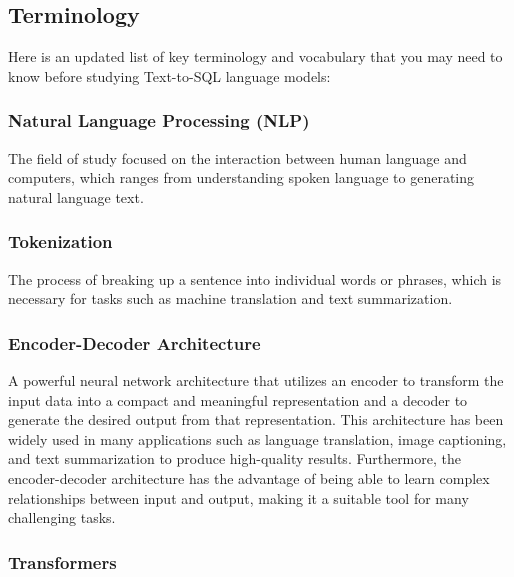 \subsection{Terminology}

Here is an updated list of key terminology and vocabulary that you may need to know before studying Text-to-SQL language models:

\subsubsection{Natural Language Processing (NLP)}

The field of study focused on the interaction between human language and computers, which ranges from understanding spoken language to generating natural language text.

\subsubsection{Tokenization}

The process of breaking up a sentence into individual words or phrases, which is necessary for tasks such as machine translation and text summarization.

\subsubsection{Encoder-Decoder Architecture}

A powerful neural network architecture that utilizes an encoder\cite{cho-etal-2014-learning} to transform the input data into a compact and meaningful representation and a decoder to generate the desired output from that representation. This architecture has been widely used in many applications such as language translation, image captioning, and text summarization to produce high-quality results. Furthermore, the encoder-decoder architecture has the advantage of being able to learn complex relationships between input and output, making it a suitable tool for many challenging tasks.

\subsubsection{Transformers}

